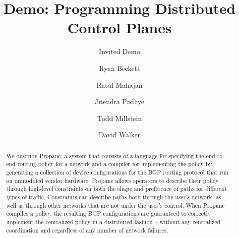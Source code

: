 \documentclass[10pt]{sig-alternate}
\newcommand{\sysname}{{\small \sf Propane}\xspace}
\begin{document}
\title{Demo: Programming Distributed Control Planes}
\subtitle{Invited Demo}
 
\author{%
Ryan Beckett\\
\and
Ratul Mahajan\\
\and
Jitendra Padhye\\
\and
Todd Millstein\\
\and
David Walker\\
}

\maketitle


\begin{abstract} 
We describe \sysname, a system that consists of a language for specifying the end-to-end routing policy for a network and a compiler for implementing the policy by generating a collection of device configurations for the BGP routing protocol that run on unmodified vendor hardware. \sysname allows operators to describe their policy through high-level constraints on both the shape and preference of paths for different types of traffic. Constraints can describe paths both through the user's network, as well as through other networks that are not under the user's control.
When \sysname compiles a policy, the resulting BGP configurations are guaranteed to 
correctly implement the centralized policy in a distributed fashion -- without any centralized coordination and regardless of any number of network failures.
\end{abstract}

%
%
%
%

\end{document}

